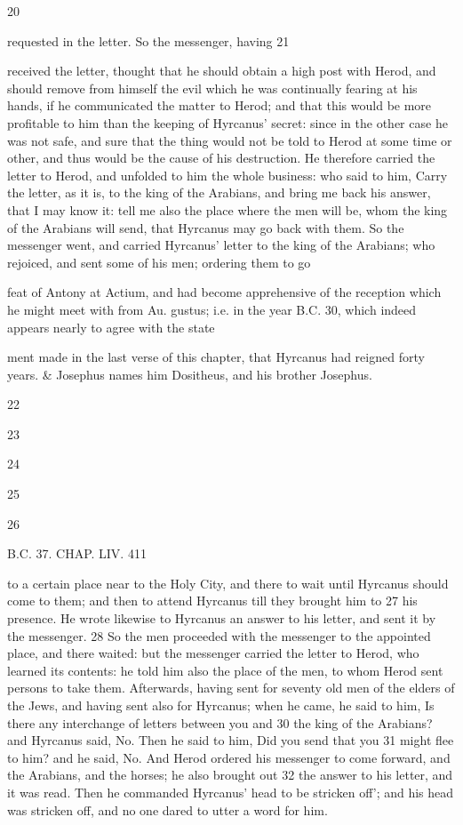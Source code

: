 20 

requested in the letter. So the messenger, having 21 

received the letter, thought that he should obtain a high post with Herod, and should remove from himself the evil which he was continually fearing at his hands, if he communicated the matter to Herod; and that this would be more profitable to him than the keeping of Hyrcanus’ secret: since in the other case he was not safe, and sure that the thing would not be told to Herod at some time or other, and thus would be the cause of his destruction. He therefore carried the letter to Herod, and unfolded to him the whole business: who said to him, Carry the letter, as it is, to the king of the Arabians, and bring me back his answer, that I may know it: tell me also the place where the men will be, whom the king of the Arabians will send, that Hyrcanus may go back with them. 
So the messenger went, and carried Hyrcanus’ letter to the king of the Arabians; who rejoiced, and sent some of his men; ordering them to go 

feat of Antony at Actium, and had become apprehensive of the reception which he might meet with from Au. gustus; i.e. in the year B.C. 30, which indeed appears nearly to agree with the state

ment made in the last verse of this chapter, that Hyrcanus had reigned forty years. & Josephus names him Dositheus, and his brother Josephus. 

22 

23 

24 

25 

26 

B.C. 37. CHAP. LIV. 411 

to a certain place near to the Holy City, and there to wait until Hyrcanus should come to them; and then to attend Hyrcanus till they brought him to 27 his presence. He wrote likewise to Hyrcanus an answer to his letter, and sent it by the messenger. 28 So the men proceeded with the messenger to the appointed place, and there waited: but the messenger carried the letter to Herod, who learned its contents: he told him also the place of the men, to whom Herod sent persons to take them. Afterwards, having sent for seventy old men of the elders of the Jews, and having sent also for Hyrcanus; when he came, he said to him, Is there any interchange of letters between you and 30 the king of the Arabians? and Hyrcanus said, No. Then he said to him, Did you send that you 31 might flee to him? and he said, No. And Herod ordered his messenger to come forward, and the Arabians, and the horses; he also brought out 32 the answer to his letter, and it was read. Then he commanded Hyrcanus’ head to be stricken off'; and his head was stricken off, and no one dared to utter a word for him. 

